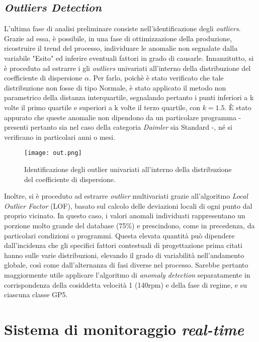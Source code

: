 \documentclass[fleqn,10pt]{SelfArx} %
\begin{document}
\subsection{\textit{Outliers Detection}}
L'ultima fase di analisi preliminare consiste nell'identificazione degli \textit{outliers}. Grazie ad essa, è possibile, in una fase di ottimizzazione della produzione, ricostruire il trend del processo, individuare le anomalie non segnalate dalla variabile "Esito" ed inferire eventuali fattori in grado di causarle. Innanzitutto, si è proceduto ad estrarre i gli \textit{outliers} univariati all'interno della distribuzione del coefficiente di dispersione $\alpha$. Per farlo, poichè è stato verificato che tale distribuzione non fosse di tipo Normale, è stato applicato il metodo non parametrico della distanza interquartile, segnalando pertanto i punti inferiori a k volte il primo quartile e superiori a k volte il terzo quartile, con $k = 1.5$. È stato appurato che queste anomalie non dipendono da un particolare programma - presenti pertanto sia nel caso della categoria \textit{Daimler} sia Standard -, né si verificano in particolari anni o mesi.
\begin{figure}[H]
    \centering
    \texttt{[image: out.png]}
    \label{fig:em}
    \caption{Identificazione degli outlier univariati all'interno della distribuzione del coefficiente di dispersione.}
\end{figure}
Inoltre, si è proceduto ad estrarre \textit{outlier} multivariati grazie all'algoritmo \textit{Local Outlier Factor} (LOF), basato sul calcolo delle deviazioni locali di ogni punto dal proprio vicinato. In questo caso, i valori anomali individuati rappresentano un porzione molto grande del database (75\%) e prescindono, come in precedenza, da particolari condizioni o programmi. Questa elevata quantità può dipendere dall'incidenza che gli specifici fattori contestuali di progettazione prima citati hanno sulle varie distribuzioni, elevando il grado di variabilità nell'andamento globale, così come dall'alternanza di fasi diverse nel processo. Sarebbe pertanto maggiormente utile applicare l'algoritmo di \textit{anomaly detection} separatamente in corrispondenza della cosiddetta velocità 1 (140rpm) e della fase di regime, e su ciascuna classe GP5.
\section{Sistema di monitoraggio \textit{real-time}}
\end{document}
